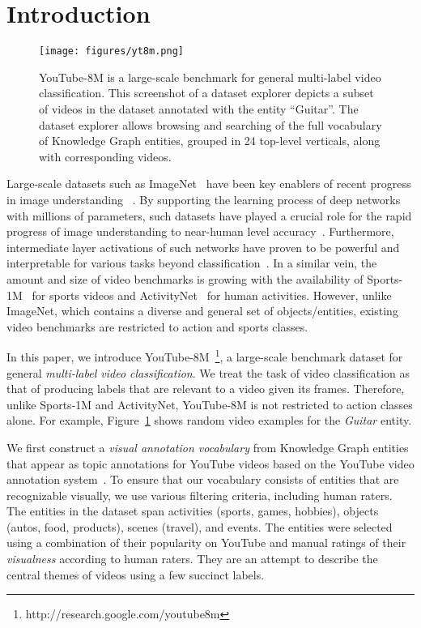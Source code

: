 \documentclass{sig-alternate-05-2015}
\begin{document}
\section{Introduction}
\label{sec:intro}

\begin{figure}[t]
\begin{center}
\texttt{[image: figures/yt8m.png]}
\end{center}
\caption{YouTube-8M is a large-scale benchmark for general multi-label video classification. This screenshot of a dataset explorer depicts a subset of videos in the dataset annotated with the entity ``Guitar''.  The dataset explorer allows browsing and searching of the full vocabulary of Knowledge Graph entities, grouped in 24 top-level verticals, along with corresponding videos. 
}
\label{fig:examples}
\end{figure}

Large-scale datasets such as ImageNet~\cite{ImageNet} have been key enablers of
recent progress in image understanding ~\cite{krizhevsky2012imagenet, inception-bn, resnet}.
By supporting the learning process of deep networks with millions of parameters, such datasets have played a crucial role
for the rapid progress of image understanding to near-human level accuracy~\cite{imagenetreview}.
Furthermore, intermediate layer activations of such networks have proven to be
powerful and interpretable for various tasks beyond
classification~\cite{oldzeiler13visualizing, girshick15fastrcnn, overfeat}.
In a similar vein, the amount and size of video benchmarks is growing with the
availability of Sports-1M~\cite{karpathy2014large} for sports videos and
ActivityNet~\cite{actnet} for human activities. However, unlike ImageNet, which
contains a diverse and general set of objects/entities, existing video benchmarks
are restricted to action and sports classes.

In this paper, we introduce YouTube-8M~\footnote{http://research.google.com/youtube8m}, a large-scale benchmark dataset for general
\emph{multi-label video classification}. We treat the task of video
classification as that of producing labels that are relevant to a video given
its frames. Therefore, unlike Sports-1M and ActivityNet, YouTube-8M is not
restricted to action classes alone. For example, Figure~\ref{fig:examples} shows random video examples for the {\it Guitar} entity.

We first construct a \emph{visual annotation vocabulary} from Knowledge Graph entities that appear as topic annotations for
YouTube videos based on the YouTube video annotation system~\cite{youtube-legos}.
To ensure that our vocabulary consists of entities that are recognizable visually,
we use various filtering criteria, including human raters. The entities in the dataset span activities (sports, games,
hobbies), objects (autos, food, products), scenes (travel), and events. The entities were selected using a combination of their popularity on YouTube and
manual ratings of their {\em visualness} according to human raters.
They are an attempt to describe the central themes of videos using a few succinct labels.
\end{document}
